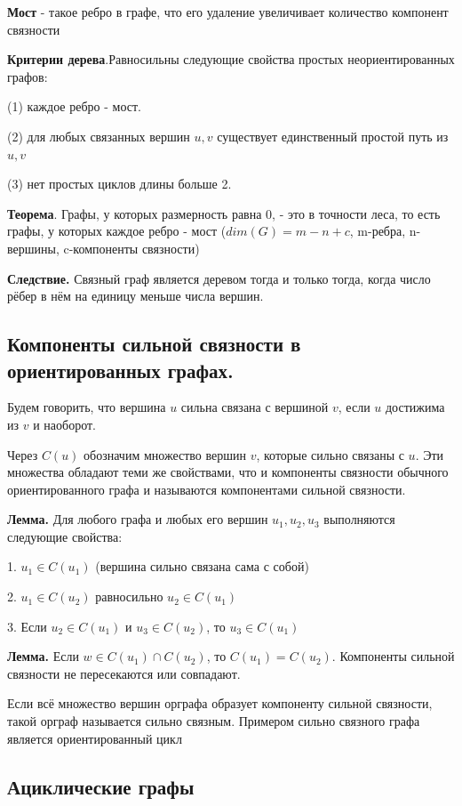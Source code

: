 \documentclass[a4paper, 10pt]{article}
\begin{document}
\textbf{Мост} - такое ребро в графе, что его удаление увеличивает количество компонент связности

\textbf{Критерии дерева}.Равносильны следующие свойства простых неориентированных графов:

(1) каждое ребро - мост.

(2) для любых связанных вершин $u, v$ существует единственный простой путь из $u, v$

(3) нет простых циклов длины больше 2.

\textbf{Теорема}. Графы, у которых размерность равна 0, - это в точности леса, то есть графы, у которых каждое ребро - мост ($dim(G) = m - n + c$, m-ребра, n-вершины, c-компоненты связности)

\textbf{Следствие.} Связный граф является деревом тогда и только тогда, когда число рёбер в нём на единицу меньше числа вершин.


\subsection{Компоненты сильной связности в ориентированных графах.}

Будем говорить, что вершина $u$ сильна связана с вершиной $v$, если $u$ достижима из $v$ и наоборот.

Через $C(u)$ обозначим множество вершин $v$, которые сильно связаны с $u$. Эти множества обладают теми же свойствами, что и компоненты связности обычного ориентированного графа и называются компонентами сильной связности.

\textbf{Лемма.} Для любого графа и любых его вершин $u_1, u_2, u_3$ выполняются следующие свойства:

1. $u_1 \in C(u_1)$ (вершина сильно связана сама с собой)

2. $u_1 \in C(u_2)$ равносильно $u_2 \in C(u_1)$

3. Если $u_2 \in C(u_1)$ и $u_3 \in C(u_2)$, то $u_3 \in C(u_1)$


\textbf{Лемма.} Если $w \in C(u_1) \cap C(u_2)$, то $C(u_1) = C(u_2)$. Компоненты сильной связности не пересекаются или совпадают.

Если всё множество вершин орграфа образует компоненту сильной связности, такой орграф называется сильно связным. Примером сильно связного графа является ориентированный цикл



\subsection{Ациклические графы}
\end{document}
